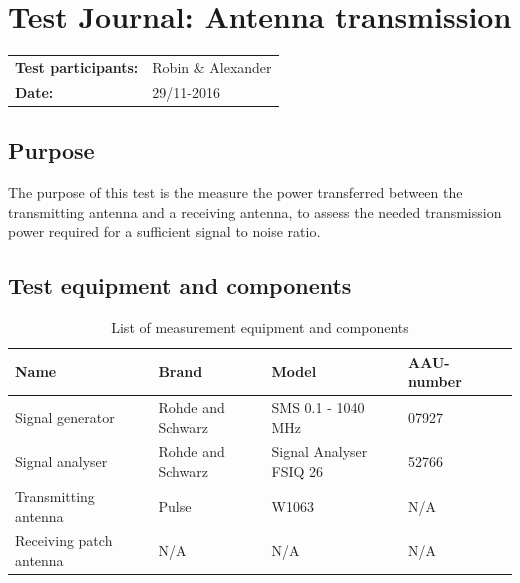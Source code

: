 \chapter{Test Journal: Antenna transmission}\label{appendix:antennaTransmission}
\begin{table}[!h]
\begin{tabular}{l l}
\textbf{Test participants:} & Robin \& Alexander\\
\textbf{Date:}  & 29/11-2016
\end{tabular}
\end{table}

\section*{Purpose}
The purpose of this test is the measure the power transferred between the transmitting antenna and a receiving antenna, to assess the needed transmission power required for a sufficient signal to noise ratio.
\section*{Test equipment and components}
\begin{table}[!h]
	\centering
	\caption{List of measurement equipment and components}

	\begin{tabularx}{\textwidth}{lXXXX}
		Name 				& Brand	& Model & AAU-number\\ \toprule \rowcolor{lightGrey}
		Signal generator & Rohde and Schwarz & SMS 0.1 - 1040 MHz & 07927 \\ 
		Signal analyser & Rohde and Schwarz & Signal Analyser FSIQ 26 & 52766\\\rowcolor{lightGrey}
		Transmitting antenna & Pulse & W1063 & N/A\\
		Receiving patch antenna & N/A & N/A & N/A \\
	\end{tabularx}
\end{table}\label{tab_appendix:antennaTransmission}

